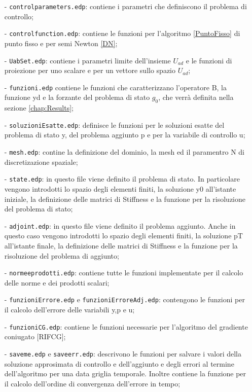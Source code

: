 \begin{itemize}
\item[-] \texttt{controlparameters.edp}: contiene i parametri che definiscono il problema di controllo;
\item[-] \texttt{controlfunction.edp}: contiene le funzioni per l'algoritmo \ref{PuntoFisso} di punto fisso e per semi Newton \ref{DN};
\item[-] \texttt{UabSet.edp}: contiene i parametri limite dell'insieme $U_{ad}$ e le funzioni di proiezione per uno scalare e per un vettore sullo spazio $U_{ad}$;
\item[-] \texttt{funzioni.edp} contiene le funzioni che caratterizzano l'operatore B, la funzione yd e la forzante del problema di stato $g_0$, che verrà definita nella sezione \ref{chap:Results};
\item[-] \texttt{soluzioniEsatte.edp}: definisce le funzioni per le soluzioni esatte del problema di stato y, del problema aggiunto p e per la variabile di controllo u;
\item[-] \texttt{mesh.edp}: contine la definizione del dominio, la mesh ed il paramentro N di discretizazione spaziale;
\item[-] \texttt{state.edp}: in questo file viene definito il problema di stato. In particolare vengono introdotti lo spazio degli elementi finiti, la soluzione y0 all'istante iniziale, la definizione delle matrici di Stiffness e la funzione per la risoluzione del problema di stato;
\item[-] \texttt{adjoint.edp}: in questo file viene definito il problema aggiunto. Anche in questo caso vengono introdotti lo spazio degli elementi finiti, la soluzione pT all'istante finale, la definizione delle matrici di Stiffness e la funzione per la risoluzione del problema di aggiunto; 
\item[-] \texttt{normeeprodotti.edp}: contiene tutte le funzioni implementate per il calcolo delle norme e dei prodotti scalari; 
\item[-] \texttt{funzioniErrore.edp} e \texttt{funzioniErroreAdj.edp}: contengono le funzioni per il calcolo dell'errore delle variabili y,p e u;
\item[-] \texttt{funzioniCG.edp}: contiene le funzioni necessarie per l'algoritmo del gradiente coniugato [RIFCG]; 
\item[-] \texttt{saveme.edp} e \texttt{saveerr.edp}: descrivono le funzioni per salvare i valori della soluzione approsimata di controllo e dell'aggiunto e degli errori al termine dell'algoritmo per una data griglia temporale. Inoltre contiene la funzione per il calcolo dell'ordine di convergenza dell'errore in tempo;
\end{itemize}
